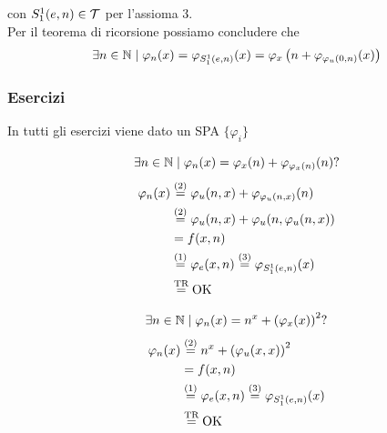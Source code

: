 con $S_1^1 (e,n) \in \mathcal{T}$ per l'assioma 3.\\

Per il teorema di ricorsione possiamo concludere che
$$ \exists n \in \mathbb{N} \mid \varphi_n (x) = \varphi_{S^1_1 (e,n)} (x) = \varphi_x \left(n + \varphi_{\varphi_u (0,n)} (x)\right) $$

\subsubsection{Esercizi}

In tutti gli esercizi viene dato un SPA $\{\varphi_i\}$

$$ \exists n \in \mathbb{N} \mid \varphi_n (x) = \varphi_x (n) + \varphi_{\varphi_x (n)} (n)? $$
\begin{align*}
	\varphi_n (x) & \stackrel{(2)}{=} \varphi_u (n,x) + \varphi_{\varphi_u (n,x)} (n) \\
	& \stackrel{(2)}{=} \varphi_u (n,x) + \varphi_u (n, \varphi_u (n,x)) \\
	& = f(x,n) \\
	& \stackrel{(1)}{=} \varphi_e (x,n) \stackrel{(3)}{=} \varphi_{S^1_1 (e,n)} (x) \\
	& \stackrel{\text{TR}}{=} \text{OK}
\end{align*}

$$ \exists n \in \mathbb{N} \mid \varphi_n (x) = n^x + \left(\varphi_x (x)\right)^2 ? $$
\begin{align*}
	\varphi_n (x) & \stackrel{(2)}{=} n^x + \left(\varphi_u (x,x)\right)^2 \\
	& = f(x,n) \\
	& \stackrel{(1)}{=} \varphi_e (x,n) \stackrel{(3)}{=} \varphi_{S^1_1 (e,n)} (x) \\
	& \stackrel{\text{TR}}{=} \text{OK}
\end{align*}

